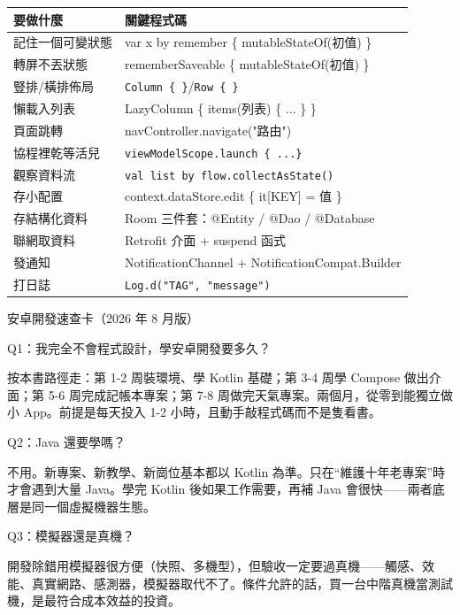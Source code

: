 


\begin{center}
\begin{tabularx}{\linewidth}{|X|X|}
\hline
\textbf{要做什麼} & \textbf{關鍵程式碼} \tabularnewline
\hline
記住一個可變狀態 & var x by remember \{ mutableStateOf(初值) \} \tabularnewline
轉屏不丟狀態 & rememberSaveable \{ mutableStateOf(初值) \} \tabularnewline
豎排/橫排佈局 & \texttt{Column \{ \}}/\texttt{Row \{ \}} \tabularnewline
懶載入列表 & LazyColumn \{ items(列表) \{ ... \} \} \tabularnewline
頁面跳轉 & navController.navigate("路由") \tabularnewline
協程裡乾等活兒 & \texttt{viewModelScope.\allowbreak launch \{ .\allowbreak .\allowbreak .\allowbreak  \}} \tabularnewline
觀察資料流 & \texttt{val list by flow.\allowbreak collectAsState()} \tabularnewline
存小配置 & context.dataStore.edit \{ it[KEY] = 值 \} \tabularnewline
存結構化資料 & Room 三件套：@Entity / @Dao / @Database \tabularnewline
聯網取資料 & Retrofit 介面 + suspend 函式 \tabularnewline
發通知 & NotificationChannel + NotificationCompat.Builder \tabularnewline
打日誌 & \texttt{Log.\allowbreak d("TAG", "message")} \tabularnewline
\hline
\end{tabularx}
\end{center}

\begin{center}\small\color{gray}安卓開發速查卡（2026 年 8 月版）\end{center}


Q1：我完全不會程式設計，學安卓開發要多久？

按本書路徑走：第 1-2 周裝環境、學 Kotlin 基礎；第 3-4 周學 Compose 做出介面；第 5-6 周完成記帳本專案；第 7-8 周做完天氣專案。兩個月，從零到能獨立做小 App。前提是每天投入 1-2 小時，且動手敲程式碼而不是隻看書。

Q2：Java 還要學嗎？

不用。新專案、新教學、新崗位基本都以 Kotlin 為準。只在“維護十年老專案”時才會遇到大量 Java。學完 Kotlin 後如果工作需要，再補 Java 會很快——兩者底層是同一個虛擬機器生態。

Q3：模擬器還是真機？

開發除錯用模擬器很方便（快照、多機型），但驗收一定要過真機——觸感、效能、真實網路、感測器，模擬器取代不了。條件允許的話，買一台中階真機當測試機，是最符合成本效益的投資。


